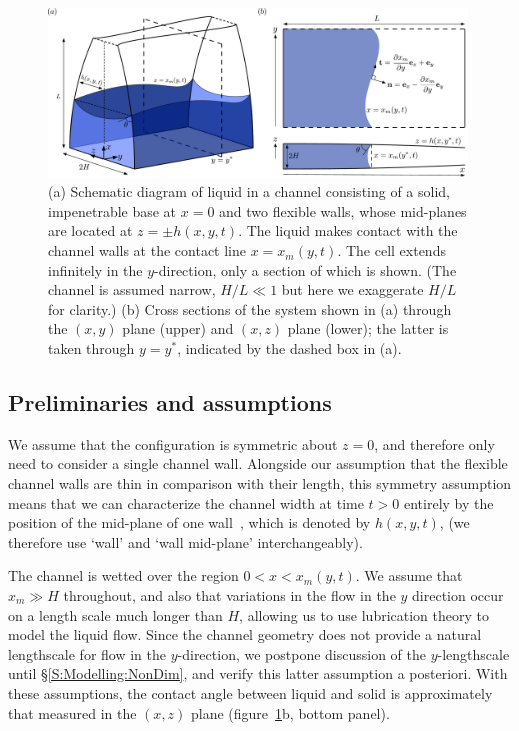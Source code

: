 \documentclass{jfm}
\begin{document}
\begin{figure}
\centering
\includegraphics[width=0.99\textwidth]{figures/fig4_schematic.pdf}
\caption{(a) Schematic diagram of liquid in a channel consisting of a solid, impenetrable base at $x =0$ and two flexible walls, whose mid-planes are located at $z = \pm h(x,y,t)$. The liquid makes contact with the channel walls at the contact line $x = x_m(y,t)$. The cell extends infinitely in the $y$-direction, only a section of which is shown. (The channel is assumed narrow, $H / L \ll 1$ but here we exaggerate $H/L$ for clarity.) (b) Cross sections of the system shown in (a) through the $(x,y)$ plane (upper) and $(x,z)$ plane (lower); the latter is taken through $y = y^*$, indicated by the dashed box in (a).}
\label{fig:Modelling:Schematic}
\end{figure}

\subsection{Preliminaries and assumptions}
We assume that the configuration is symmetric about $z = 0$, and therefore only need to consider a single channel wall. Alongside our assumption that the flexible channel walls are thin in comparison with their length, this symmetry assumption means that we can characterize the channel width at time $t > 0$ entirely by the position of the mid-plane of one wall~\citep{Reddy2006}, which is denoted by $h(x,y,t)$, (we therefore use `wall' and `wall mid-plane' interchangeably).

The channel is wetted over the region $0 < x < x_m(y,t)$. We assume that $x_m \gg H$ throughout, and also that variations in the flow in the $y$ direction occur on a length scale much longer than $H$, allowing us to use lubrication theory to model the liquid flow. Since the channel geometry does not provide a natural lengthscale for flow in the $y$-direction, we postpone discussion of the $y$-lengthscale until \S\ref{S:Modelling:NonDim}, and verify this latter assumption a posteriori. With these assumptions, the contact angle between liquid and solid is approximately that measured in the $(x,z)$ plane (figure~\ref{fig:Modelling:Schematic}b, bottom panel).
\end{document}
